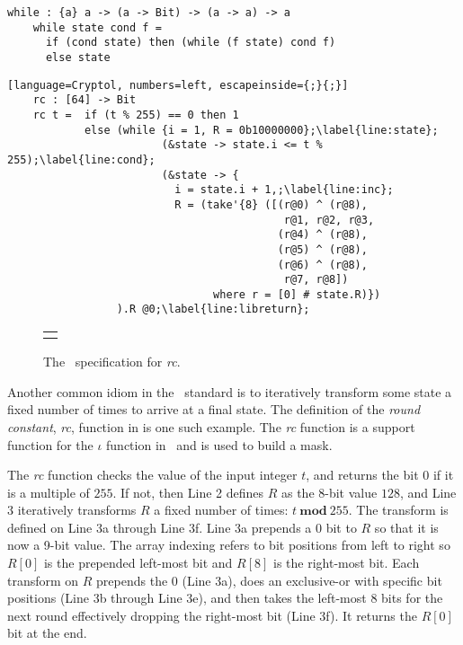 \newsavebox{\whilemethod}
\begin{lrbox}{\whilemethod}
  \begin{lstlisting}[language=Cryptol]
    while : {a} a -> (a -> Bit) -> (a -> a) -> a
    while state cond f = 
      if (cond state) then (while (f state) cond f)	
      else state
  \end{lstlisting}
\end{lrbox}

\newsavebox{\RcCryLib}
\begin{lrbox}{\RcCryLib}
  \begin{lstlisting}[language=Cryptol, numbers=left, escapeinside={;}{;}]
    rc : [64] -> Bit
    rc t =  if (t % 255) == 0 then 1 
            else (while {i = 1, R = 0b10000000};\label{line:state};
                        (&state -> state.i <= t % 255);\label{line:cond};
                        (&state -> {
                          i = state.i + 1,;\label{line:inc};
                          R = (take'{8} ([(r@0) ^ (r@8),
                                           r@1, r@2, r@3,
                                          (r@4) ^ (r@8),
                                          (r@5) ^ (r@8),
                                          (r@6) ^ (r@8),
                                           r@7, r@8]) 
                                where r = [0] # state.R)})
                 ).R @0;\label{line:libreturn};
  \end{lstlisting}
\end{lrbox}

\begin{figure}[t]
  \begin{center}
    \begin{tabular}{l}
      \usebox{\fipsRc}
    \end{tabular}
  \end{center}
  \caption{The \fips\ specification for \emph{rc}.}
  \label{fig:rc}
\end{figure}

Another common idiom in the \fips\ standard is to iteratively transform some state a fixed number of times to arrive at a final state.
The definition of the \emph{round constant}, \emph{rc}, function in  is one such example.
The \emph{rc} function is a support function for the $\iota$ function in \keccak\ and is used to build a mask.

The \emph{rc} function checks the value of the input integer $t$, and returns the bit $0$ if it is a multiple of $255$.
If not, then Line 2 defines $R$ as the 8-bit value $128$, and Line 3 iteratively transforms $R$ a fixed number of times: $t\ \mathbf{mod}\ 255$.
The transform is defined on Line 3a through Line 3f.
Line 3a prepends a $0$ bit to $R$ so that it is now a 9-bit value. The array indexing refers to bit positions from left to right so $R[0]$ is the prepended left-most bit and $R[8]$ is the right-most bit. Each transform on $R$ prepends the 0 (Line 3a), does an exclusive-or with specific bit positions (Line 3b through Line 3e), and then takes the left-most 8 bits for the next round effectively dropping the right-most bit (Line 3f).
It returns the $R[0]$ bit at the end.

